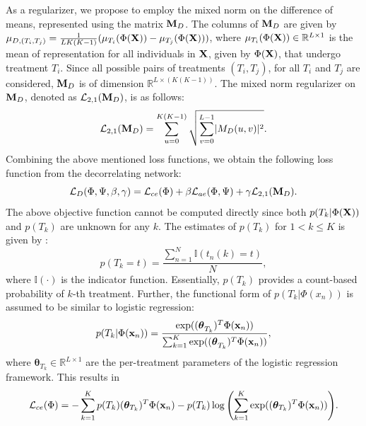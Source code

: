 \documentclass[twoside,11pt]{article}
\begin{document}
As a regularizer, we propose to employ the mixed norm on the difference of means, represented using the matrix $\mathbf{M}_D$. The columns of $\mathbf{M}_D$ are given by $\mu_{D,(T_i,T_j)} = \frac{1}{LK(K-1)}(\mu_{T_i}(\Phi(\mathbf{X})) - \mu_{T_j}(\Phi(\mathbf{X})))$, where $\mu_{T_i}(\Phi(\mathbf{X})) \in \mathbb{R}^{L \times 1}$ is the mean of representation for all individuals in $\mathbf{X}$, given by $\Phi(\mathbf{X})$, that undergo treatment $T_i$. Since all possible pairs of treatments $(T_i,T_j)$, for all $T_i$ and $T_j$ are considered, $\mathbf{M}_D$ is of dimension $\mathbb{R}^{L \times (K(K-1))}$. The mixed norm regularizer on $\mathbf{M}_{D}$, denoted as $\mathcal{L}_{2,1}(\mathbf{M}_D)$, is as follows:
\begin{equation}
    \mathcal{L}_{2,1}(\mathbf{M}_D) = \sum_{u = 0}^{K(K-1)}\sqrt{\sum_{v = 0}^{L-1} \lvert M_D(u,v)\rvert^2}.
    \label{eq:ell21}
\end{equation}
Combining the above mentioned loss functions, we obtain the following loss function from the decorrelating network:
\begin{equation}
    \mathcal{L}_D(\Phi,\Psi,\beta,\gamma) = \mathcal{L}_{ce}(\Phi) + \beta \mathcal{L}_{ae}(\Phi,\Psi) + \gamma \mathcal{L}_{2,1}(\mathbf{M}_D).
    \label{eq:ellD}
\end{equation}
The above objective function cannot be computed directly since both $p(T_k |\Phi(\mathbf{X}))$ and $p(T_k)$ are unknown for any $k$. The estimates of $p(T_k)$ for $1 < k \leq K$ is given by \citep{atan2018deep}:
\begin{equation}
    p(T_{k} = t) = \frac{\sum_{n = 1}^N \mathbb{I}(t_n(k) = t)}{N},
\end{equation}
where $\mathbb{I}(\cdot)$ is the indicator function. Essentially, $p(T_k)$ provides a count-based probability of $k$-{th} treatment. Further, the functional form of $p(T_k|\Phi(x_n))$ is assumed to be similar to logistic regression:
\begin{equation}
   p(T_k|\Phi(\mathbf{x}_n)) = \frac{\exp({(\bm{\theta}}_{T_k})^T\Phi(\mathbf{x}_n))}{\sum_{k=1}^{K}\exp({(\bm{\theta}}_{T_k})^T\Phi(\mathbf{x}_n))},
   \label{eq:logisticloss}
\end{equation}
where $\bm{\theta}_{T_{k}} \in \mathbb{R}^{L \times 1}$ are the per-treatment parameters of the logistic regression framework. This results in 
\begin{equation}
     \mathcal{L}_{ce}(\Phi) = -\sum_{k=1}^{K} p(T_k)(\bm{\theta}_{T_{k}})^T\Phi(\mathbf{x}_n) - p(T_k)\log{\left(\sum_{k=1}^{K}\exp((\bm{\theta}_{T_{k}})^T\Phi(\mathbf{x}_n))\right)}.
    \label{eq:ellce}
\end{equation}
\end{document}
